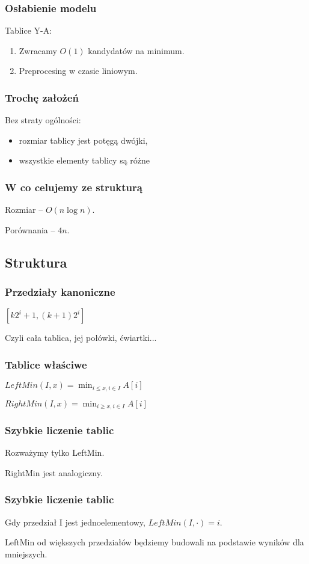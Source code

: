 \documentclass{beamer}
\begin{document}
\begin{frame} \frametitle{Osłabienie modelu}
 Tablice Y-A:
 \begin{enumerate}
  \item Zwracamy $O(1)$ kandydatów na minimum.
  \item Preprocesing w czasie liniowym.
\end{enumerate}
\end{frame}

\begin{frame} \frametitle{Trochę założeń}
 Bez straty ogólności:
 \begin{itemize}
  \item rozmiar tablicy jest potęgą dwójki,
  \item wszystkie elementy tablicy są różne
 \end{itemize}
\end{frame} 

\begin{frame} \frametitle{W co celujemy ze strukturą}
 Rozmiar -- $O(n\log n)$.
 
 Porównania -- $4n$.
\end{frame}

\subsection{Struktura}
\begin{frame} \frametitle{Przedziały kanoniczne}
 $[k 2^i + 1, (k + 1) 2^i]$
 
 Czyli cała tablica, jej połówki, ćwiartki...
\end{frame}

\begin{frame} \frametitle{Tablice właściwe}
 $LeftMin(I,x) = \min_{i \leq x, i \in I} A[i]$
 
 $RightMin(I,x) = \min_{i \geq x, i \in I} A[i]$
\end{frame}

\begin{frame} \frametitle{Szybkie liczenie tablic}
 Rozważymy tylko LeftMin.
 
 RightMin jest analogiczny.
\end{frame}

\begin{frame} \frametitle{Szybkie liczenie tablic}
 Gdy przedział I jest jednoelementowy, $LeftMin(I,\cdot) = i$.
 
 LeftMin od większych przedziałów będziemy budowali na podstawie wyników dla mniejszych.
\end{frame}
\end{document}
